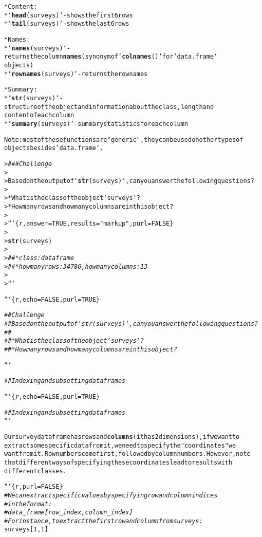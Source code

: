 \documentclass{article}\usepackage[]{graphicx}\usepackage[]{xcolor}
\makeatletter
\newcommand{\hlstr}[1]{\textcolor[rgb]{0.192,0.494,0.8}{#1}}%
\newcommand{\hlcom}[1]{\textcolor[rgb]{0.678,0.584,0.686}{\textit{#1}}}%
\newcommand{\hlkwd}[1]{\textcolor[rgb]{0.737,0.353,0.396}{\textbf{#1}}}%
\newenvironment{kframe}{%
 \def\at@end@of@kframe{}%
 \ifinner\ifhmode%
  \def\at@end@of@kframe{\end{minipage}}%
  \begin{minipage}{\columnwidth}%
 \fi\fi%
 \def\FrameCommand##1{\hskip\@totalleftmargin \hskip-\fboxsep
 \colorbox{shadecolor}{##1}\hskip-\fboxsep
     \hskip-\linewidth \hskip-\@totalleftmargin \hskip\columnwidth}%
 \MakeFramed {\advance\hsize-\width
   \@totalleftmargin\z@ \linewidth\hsize
   \@setminipage}}%
 {\par\unskip\endMakeFramed%
 \at@end@of@kframe}
\newenvironment{knitrout}{}{} %
\makeatother
\begin{document}
\begin{knitrout}
\begin{kframe}
\begin{alltt}
* Content:
    * `\hlkwd{head}(surveys)` - shows the first 6 rows
    * `\hlkwd{tail}(surveys)` - shows the last 6 rows

* Names:
    * `\hlkwd{names}(surveys)` - returns the column \hlkwd{names} (synonym of `\hlkwd{colnames}()` for `data.frame`
	   objects)
    * `\hlkwd{rownames}(surveys)` - returns the row names

* Summary:
    * `\hlkwd{str}(surveys)` - structure of the object and information about the class, length and
	   content of  each column
    * `\hlkwd{summary}(surveys)` - summary statistics for each column

Note: most of these functions are \hlstr{"generic"}, they can be used on other types of
objects besides `data.frame`.


> \hlcom{### Challenge}
>
> Based on the output of `\hlkwd{str}(surveys)`, can you answer the following questions?
>
> * What is the class of the object `surveys`?
> * How many rows and how many columns are in this object?
>
> ```\{r, answer=TRUE, results=\hlstr{"markup"}, purl=FALSE\}
>
> \hlkwd{str}(surveys)
>
> \hlcom{## * class: data frame}
> \hlcom{## * how many rows: 34786,  how many columns: 13}
>
> ```


```\{r, echo=FALSE, purl=TRUE\}

\hlcom{## Challenge}
\hlcom{## Based on the output of `str(surveys)`, can you answer the following questions?}
\hlcom{##}
\hlcom{## * What is the class of the object `surveys`?}
\hlcom{## * How many rows and how many columns are in this object?}

```



\hlcom{## Indexing and subsetting data frames}

```\{r, echo=FALSE, purl=TRUE\}

\hlcom{## Indexing and subsetting data frames}
```


Our survey data frame has rows and \hlkwd{columns} (it has 2 dimensions), if we want to
extract some specific data from it, we need to specify the \hlstr{"coordinates"} we
want from it. Row numbers come first, followed by column numbers. However, note
that different ways of specifying these coordinates lead to results with
different classes.

```\{r, purl=FALSE\}
\hlcom{# We can extract specific values by specifying row and column indices}
\hlcom{# in the format: }
\hlcom{# data_frame[row_index, column_index]}
\hlcom{# For instance, to extract the first row and column from surveys:}
surveys[1, 1]


\end{alltt}
\end{kframe}
\end{knitrout}
\end{document}

